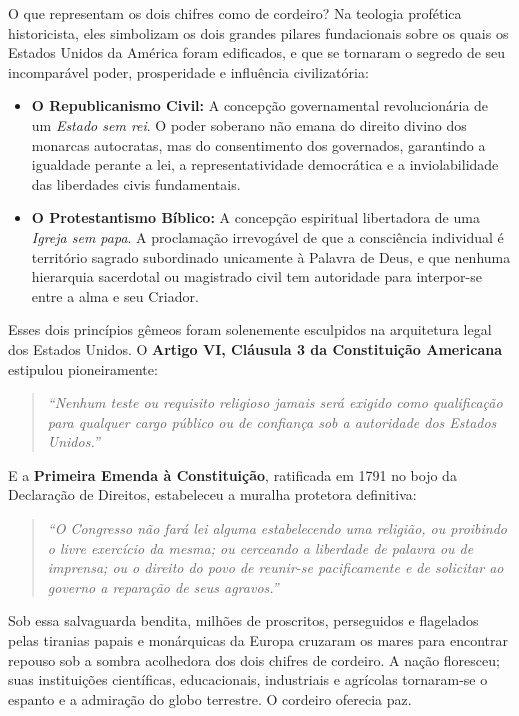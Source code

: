 \documentclass[11pt,a4paper,openany]{book}
\begin{document}
O que representam os dois chifres como de cordeiro? Na teologia profética historicista, eles simbolizam os dois grandes pilares fundacionais sobre os quais os Estados Unidos da América foram edificados, e que se tornaram o segredo de seu incomparável poder, prosperidade e influência civilizatória:
\begin{itemize}
  \item \textbf{O Republicanismo Civil:} A concepção governamental revolucionária de um \textit{Estado sem rei}. O poder soberano não emana do direito divino dos monarcas autocratas, mas do consentimento dos governados, garantindo a igualdade perante a lei, a representatividade democrática e a inviolabilidade das liberdades civis fundamentais.
  \item \textbf{O Protestantismo Bíblico:} A concepção espiritual libertadora de uma \textit{Igreja sem papa}. A proclamação irrevogável de que a consciência individual é território sagrado subordinado unicamente à Palavra de Deus, e que nenhuma hierarquia sacerdotal ou magistrado civil tem autoridade para interpor-se entre a alma e seu Criador.
\end{itemize}


Esses dois princípios gêmeos foram solenemente esculpidos na arquitetura legal dos Estados Unidos. O \textbf{Artigo VI, Cláusula 3 da Constituição Americana} estipulou pioneiramente:


\begin{quote}
\itshape \textit{``Nenhum teste ou requisito religioso jamais será exigido como qualificação para qualquer cargo público ou de confiança sob a autoridade dos Estados Unidos.''}
\end{quote}


E a \textbf{Primeira Emenda à Constituição}, ratificada em 1791 no bojo da Declaração de Direitos, estabeleceu a muralha protetora definitiva:


\begin{quote}
\itshape \textit{``O Congresso não fará lei alguma estabelecendo uma religião, ou proibindo o livre exercício da mesma; ou cerceando a liberdade de palavra ou de imprensa; ou o direito do povo de reunir-se pacificamente e de solicitar ao governo a reparação de seus agravos.''}
\end{quote}


Sob essa salvaguarda bendita, milhões de proscritos, perseguidos e flagelados pelas tiranias papais e monárquicas da Europa cruzaram os mares para encontrar repouso sob a sombra acolhedora dos dois chifres de cordeiro. A nação floresceu; suas instituições científicas, educacionais, industriais e agrícolas tornaram-se o espanto e a admiração do globo terrestre. O cordeiro oferecia paz.
\end{document}
